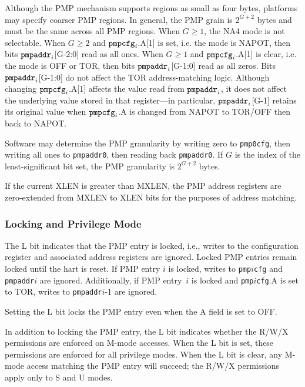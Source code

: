 Although the PMP mechanism supports regions as small as four bytes, platforms
may specify coarser PMP regions. In general, the PMP grain is $2^{G+2}$ bytes
and must be the same across all PMP regions.  When $G \geq 1$, the NA4 mode
is not selectable.  When $G \geq 2$ and ${\tt pmpcfg}_i$.A[1] is set, i.e.
the mode is NAPOT, then bits ${\tt pmpaddr}_i$[G-2:0] read as all ones.  When
$G \geq 1$ and ${\tt pmpcfg}_i$.A[1] is clear, i.e. the mode is OFF or TOR,
then bits ${\tt pmpaddr}_i$[G-1:0] read as all zeros.  Bits ${\tt
pmpaddr}_i$[G-1:0] do not affect the TOR address-matching logic.
Although changing ${\tt pmpcfg}_i$.A[1] affects the value read from
${\tt pmpaddr}_i$, it does not affect the underlying value stored in that
register---in particular, ${\tt pmpaddr}_i$[G-1] retains its original value
when ${\tt pmpcfg}_i$.A is changed from NAPOT to TOR/OFF then back to NAPOT.

\begin{commentary}
Software may determine the PMP granularity by writing zero to {\tt pmp0cfg},
then writing all ones to {\tt pmpaddr0}, then reading back {\tt pmpaddr0}.
If $G$ is the index of the least-significant bit set,
the PMP granularity is $2^{G+2}$ bytes.
\end{commentary}

If the current XLEN is greater than MXLEN, the PMP address registers are
zero-extended from MXLEN to XLEN bits for the purposes of address matching.

\subsubsection*{Locking and Privilege Mode}

The L bit indicates that the PMP entry is locked, i.e., writes to the
configuration register and associated address registers are ignored.  Locked
PMP entries remain locked until the hart is reset.  If PMP entry $i$ is
locked, writes to {\tt pmp}$i${\tt cfg} and {\tt pmpaddr}$i$ are ignored.
Additionally, if PMP entry~$i$ is locked and {\tt pmp}$i${\tt cfg}.A is set
to TOR, writes to {\tt pmpaddr}$i$-1 are ignored.

\begin{commentary}
Setting the L bit locks the PMP entry even when the A field is set to OFF.
\end{commentary}

In addition to locking the PMP entry, the L bit indicates whether the R/W/X
permissions are enforced on M-mode accesses.  When the L bit is set, these
permissions are enforced for all privilege modes.  When the L bit is clear,
any M-mode access matching the PMP entry will succeed; the R/W/X
permissions apply only to S and U modes.

